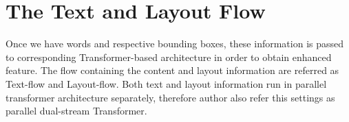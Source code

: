 














 

\section{The Text and Layout Flow}
Once we have words and respective bounding boxes, these information is passed to corresponding Transformer-based architecture in order to obtain enhanced feature. The flow containing the content and layout information are referred as Text-flow and Layout-flow. Both text and layout information run in parallel transformer architecture separately, therefore author also refer this settings as parallel dual-stream Transformer.

